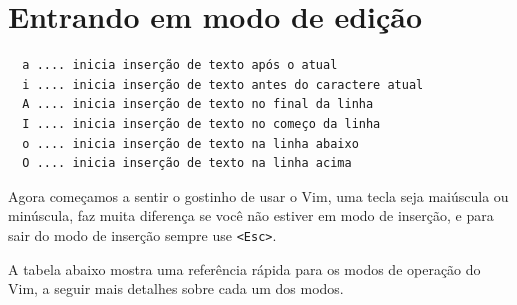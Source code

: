 \documentclass[10pt,a4paper,openany]{book}
\begin{document}
\section{Entrando em modo de edição}
\label{Entrando em modo de edição}

\begin{verbatim}
  a .... inicia inserção de texto após o atual
  i .... inicia inserção de texto antes do caractere atual
  A .... inicia inserção de texto no final da linha
  I .... inicia inserção de texto no começo da linha
  o .... inicia inserção de texto na linha abaixo
  O .... inicia inserção de texto na linha acima
\end{verbatim}

Agora começamos a sentir o gostinho de usar o Vim, uma tecla seja
maiúscula ou minúscula, faz muita diferença se você não estiver em
modo de inserção, e para sair do modo de inserção sempre use \verb|<Esc>|.

A tabela abaixo mostra uma referência rápida para os modos de operação do Vim,
a seguir mais detalhes sobre cada um dos modos.
\end{document}
